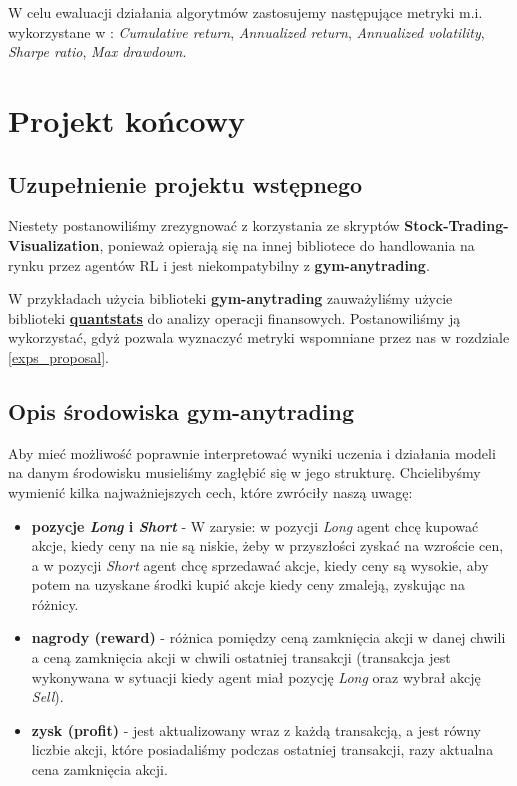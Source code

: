 \documentclass[12pt,a4paper]{article}
\begin{document}
W celu ewaluacji działania algorytmów zastosujemy następujące metryki
m.i. wykorzystane w \cite{ensemble_strat}: \emph{Cumulative return},
\emph{Annualized return}, \emph{Annualized volatility}, \emph{Sharpe ratio},
\emph{Max drawdown}.

\pagebreak
\section{Projekt końcowy}

\subsection{Uzupełnienie projektu wstępnego}

Niestety postanowiliśmy zrezygnować z korzystania ze skryptów \textbf{Stock-Trading-Visualization},
ponieważ opierają się na innej bibliotece do handlowania na rynku przez
agentów RL i jest niekompatybilny z \textbf{gym-anytrading}.

W przykładach użycia biblioteki \textbf{gym-anytrading} zauważyliśmy
użycie biblioteki
\textbf{\href{https://github.com/ranaroussi/quantstats}{quantstats}}
do analizy operacji finansowych. Postanowiliśmy ją wykorzystać, gdyż
pozwala wyznaczyć metryki wspomniane przez nas w rozdziale
\ref{exps_proposal}.

\subsection{Opis środowiska gym-anytrading}

Aby mieć możliwość poprawnie interpretować wyniki uczenia i działania
modeli na danym środowisku musieliśmy zagłębić się w jego strukturę.
Chcielibyśmy wymienić kilka najważniejszych cech, które zwróciły naszą
uwagę:

\begin{itemize}
  \item \textbf{pozycje \emph{Long} i \emph{Short}} -
        W zarysie: w pozycji \emph{Long} agent chcę kupować akcje, kiedy
        ceny na nie są niskie, żeby w przyszłości zyskać na wzroście cen,
        a w pozycji \emph{Short} agent chcę sprzedawać akcje, kiedy ceny
        są wysokie, aby potem na uzyskane środki kupić akcje kiedy ceny
        zmaleją, zyskując na różnicy.
  \item \textbf{nagrody (reward)} - różnica pomiędzy ceną zamknięcia akcji w danej
        chwili a ceną zamknięcia akcji w chwili ostatniej transakcji
        (transakcja jest wykonywana w sytuacji kiedy agent miał pozycję
        \emph{Long} oraz wybrał akcję \emph{Sell}).
  \item \textbf{zysk (profit)} - jest aktualizowany wraz z każdą
        transakcją, a jest równy liczbie akcji, które posiadaliśmy podczas
        ostatniej transakcji, razy aktualna cena zamknięcia akcji.

\end{itemize}
\end{document}
